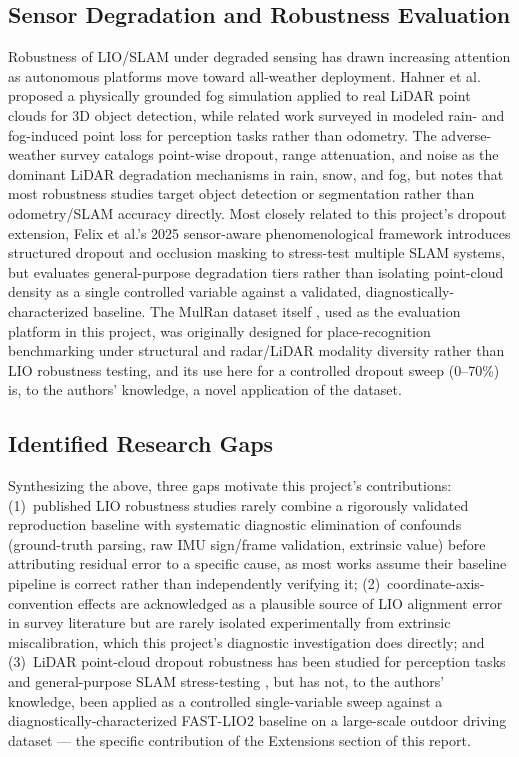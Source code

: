 \documentclass[conference]{IEEEtran}
\begin{document}
\subsection{Sensor Degradation and Robustness Evaluation}
Robustness of LIO/SLAM under degraded sensing has drawn increasing attention as autonomous platforms move toward all-weather deployment. Hahner et al.~\cite{fogsim} proposed a physically grounded fog simulation applied to real LiDAR point clouds for 3D object detection, while related work surveyed in \cite{adverseweather} modeled rain- and fog-induced point loss for perception tasks rather than odometry. The adverse-weather survey \cite{adverseweather} catalogs point-wise dropout, range attenuation, and noise as the dominant LiDAR degradation mechanisms in rain, snow, and fog, but notes that most robustness studies target object detection or segmentation rather than odometry/SLAM accuracy directly. Most closely related to this project's dropout extension, Felix et al.'s 2025 sensor-aware phenomenological framework \cite{felix2025} introduces structured dropout and occlusion masking to stress-test multiple SLAM systems, but evaluates general-purpose degradation tiers rather than isolating point-cloud density as a single controlled variable against a validated, diagnostically-characterized baseline. The MulRan dataset itself \cite{mulran}, used as the evaluation platform in this project, was originally designed for place-recognition benchmarking under structural and radar/LiDAR modality diversity rather than LIO robustness testing, and its use here for a controlled dropout sweep (0--70\%) is, to the authors' knowledge, a novel application of the dataset.

\subsection{Identified Research Gaps}
Synthesizing the above, three gaps motivate this project's contributions: (1)~published LIO robustness studies rarely combine a rigorously validated reproduction baseline with systematic diagnostic elimination of confounds (ground-truth parsing, raw IMU sign/frame validation, extrinsic value) before attributing residual error to a specific cause, as most works assume their baseline pipeline is correct rather than independently verifying it; (2)~coordinate-axis-convention effects are acknowledged as a plausible source of LIO alignment error in survey literature \cite{lidarsurvey} but are rarely isolated experimentally from extrinsic miscalibration, which this project's diagnostic investigation does directly; and (3)~LiDAR point-cloud dropout robustness has been studied for perception tasks \cite{fogsim,adverseweather} and general-purpose SLAM stress-testing \cite{felix2025}, but has not, to the authors' knowledge, been applied as a controlled single-variable sweep against a diagnostically-characterized FAST-LIO2 baseline on a large-scale outdoor driving dataset --- the specific contribution of the Extensions section of this report.
\end{document}
